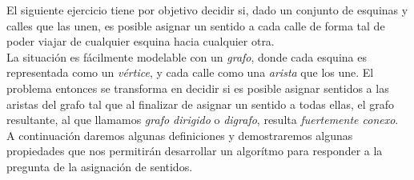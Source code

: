 El siguiente ejercicio tiene por objetivo decidir si, dado un conjunto de esquinas y calles que las unen, es posible asignar un sentido a cada calle de forma tal 
de poder viajar de cualquier esquina hacia cualquier otra. \\
La situación es fácilmente modelable con un \textit{grafo}, donde cada esquina es representada como un \textit{vértice}, y cada calle como una \textit{arista} que los une. El problema entonces se transforma en decidir si es posible asignar sentidos a las aristas del grafo tal que al finalizar de asignar un sentido a todas ellas, el grafo resultante, al que llamamos \textit{grafo dirigido} o \textit{digrafo}, resulta \textit{fuertemente conexo}. \\
A continuación daremos algunas definiciones y demostraremos algunas propiedades que nos permitirán desarrollar un algorítmo para responder a la pregunta de la asignación de sentidos.